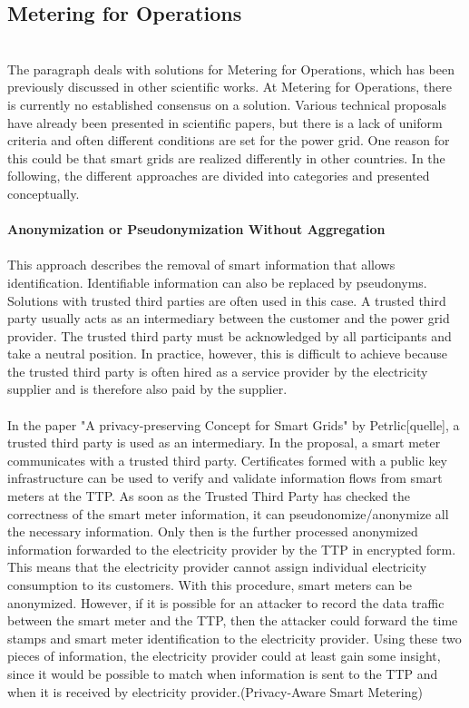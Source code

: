 \subsection{Metering for Operations}
\\
The paragraph deals with solutions for Metering for Operations, which has been previously discussed in other scientific works. At Metering for Operations, there is currently no established consensus on a solution. Various technical proposals have already been presented in scientific papers, but there is a lack of uniform criteria and often different conditions are set for the power grid. One reason for this could be that smart grids are realized differently in other countries. In the following, the different approaches are divided into categories and presented conceptually.\\
\\
\textbf{Anonymization or Pseudonymization
Without Aggregation}
\\
\\
This approach describes the removal of smart information that allows identification. Identifiable information can also be replaced by pseudonyms. Solutions with trusted third parties are often used in this case. A trusted third party usually acts as an intermediary between the customer and the power grid provider. The trusted third party must be acknowledged by all participants and take a neutral position. In practice, however, this is difficult to achieve because the trusted third party is often hired as a service provider by the electricity supplier and is therefore also paid by the supplier.\\
\\
In the paper "A privacy-preserving Concept for Smart Grids" by Petrlic[quelle], a trusted third party is used as an intermediary. In the proposal, a smart meter communicates with a trusted third party. Certificates formed with a public key infrastructure can be used to verify and validate information flows from smart meters at the TTP. As soon as the Trusted Third Party has checked the correctness of the smart meter information, it can pseudonomize/anonymize all the necessary information. Only then is the further processed anonymized information forwarded to the electricity provider by the TTP in encrypted form. This means that the electricity provider cannot assign individual electricity consumption to its customers. With this procedure, smart meters can be anonymized. 
However, if it is possible for an attacker to record the data traffic between the smart meter and the TTP, then the attacker could forward the time stamps and smart meter identification to the electricity provider. Using these two pieces of information, the electricity provider could at least gain some insight, since it would be possible to match when information is sent to the TTP and when it is received by electricity provider.(Privacy-Aware Smart Metering) \\
